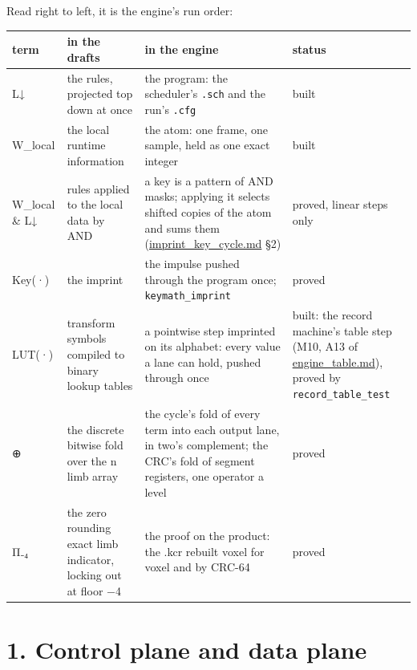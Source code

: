 Read right to left, it is the engine's run order:

{\footnotesize
\setlength{\tabcolsep}{6pt}
\begin{longtable}{>{\RaggedRight\arraybackslash}p{}>{\RaggedRight\arraybackslash}p{}>{\RaggedRight\arraybackslash}p{}>{\RaggedRight\arraybackslash}p{}}
\toprule
term & in the drafts & in the engine & status \\
\midrule
\endhead
L↓ & the rules, projected top down at once & the program: the scheduler's \texttt{.\allowbreak{}sch} and the run's \texttt{.\allowbreak{}cfg} & built \\
W\_\allowbreak{}local & the local runtime information & the atom: one frame, one sample, held as one exact integer & built \\
W\_\allowbreak{}local \& L↓ & rules applied to the local data by AND & a key is a pattern of AND masks; applying it selects shifted copies of the atom and sums them (\hyperref[chap:imprint-key-cycle]{imprint\_\allowbreak{}key\_\allowbreak{}cycle.md} §2) & proved, linear steps only \\
Key(·) & the imprint & the impulse pushed through the program once; \texttt{keymath\_\allowbreak{}imprint} & proved \\
LUT(·) & transform symbols compiled to binary lookup tables & a pointwise step imprinted on its alphabet: every value a lane can hold, pushed through once & built: the record machine's table step (M10, A13 of \hyperref[chap:engine-table]{engine\_\allowbreak{}table.md}), proved by \texttt{record\_\allowbreak{}table\_\allowbreak{}test} \\
⊕ & the discrete bitwise fold over the n limb array & the cycle's fold of every term into each output lane, in two's complement; the CRC's fold of segment registers, one operator a level & proved \\
Π₋₄ & the zero rounding exact limb indicator, locking out at floor −4 & the proof on the product: the .kcr rebuilt voxel for voxel and by CRC-64 & proved \\
\bottomrule
\end{longtable}
}

\section{\texorpdfstring{1. Control plane and data plane}{1. Control plane and data plane}}

